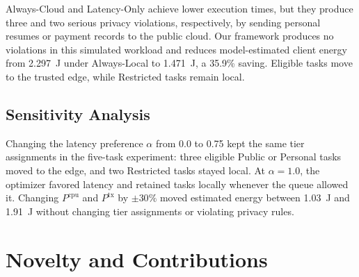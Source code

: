 \documentclass[conference]{IEEEtran}
\begin{document}
\begin{table}[t]
\caption{Scheduler Comparison Under Client Queue Contention (5 Tasks)}
\label{tab:violations}
\centering
{}
\end{table}

Always-Cloud and Latency-Only achieve lower execution times, but they produce three and two serious privacy violations, respectively, by sending personal resumes or payment records to the public cloud.
Our framework produces no violations in this simulated workload and reduces model-estimated client energy from 2.297~J under Always-Local to 1.471~J, a 35.9\% saving. Eligible tasks move to the trusted edge, while Restricted tasks remain local.

\subsection{Sensitivity Analysis}
Changing the latency preference $\alpha$ from 0.0 to 0.75 kept the same tier assignments in the five-task experiment: three eligible Public or Personal tasks moved to the edge, and two Restricted tasks stayed local.
At $\alpha=1.0$, the optimizer favored latency and retained tasks locally whenever the queue allowed it.
Changing $P^{\text{cpu}}$ and $P^{\text{tx}}$ by $\pm 30\%$ moved estimated energy between 1.03~J and 1.91~J without changing tier assignments or violating privacy rules.

\section{Novelty and Contributions}
\end{document}
